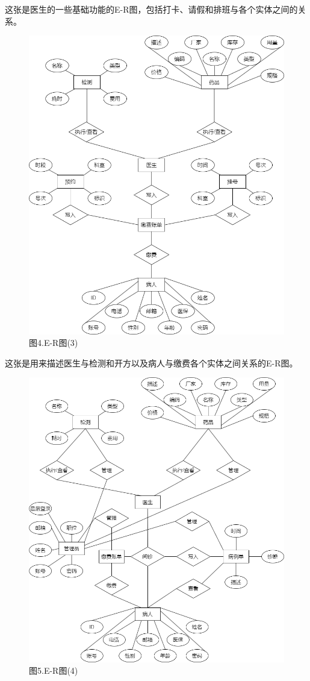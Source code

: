 \documentclass[24pt,a4paper]{article}%
\begin{document}
这张是医生的一些基础功能的E-R图，包括打卡、请假和排班与各个实体之间的关系。
\begin{figure}[H]
    \centering
    \includegraphics[width=1\textwidth]{image/E-R图(3).png}
    \caption*{图4.E-R图(3)}
\end{figure}
这张是用来描述医生与检测和开方以及病人与缴费各个实体之间关系的E-R图。
\begin{figure}[H]
    \centering
    \includegraphics[width=1\textwidth]{image/E-R图(4).png}
    \caption*{图5.E-R图(4)}
\end{figure}
\end{document}
